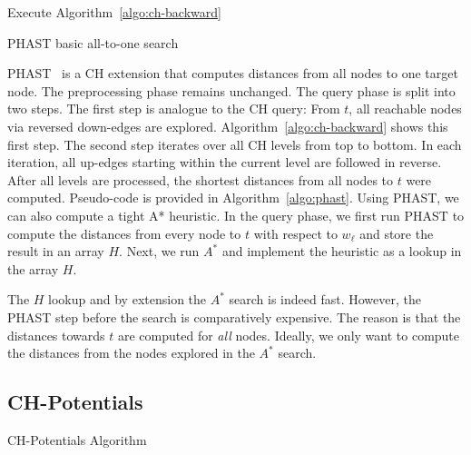 \documentclass[a4paper,USenglish,cleveref, autoref, thm-restate]{lipics-v2019}
\begin{document}
\begin{algorithm2e}
Execute Algorithm~\ref{algo:ch-backward}\;
\caption{PHAST basic all-to-one search}
\label{algo:phast}
\end{algorithm2e}

PHAST~\cite{dgnw-phast-13} is a CH extension that computes distances from all nodes to one target node.
The preprocessing phase remains unchanged.
The query phase is split into two steps.
The first step is analogue to the CH query:
From $t$, all reachable nodes via reversed down-edges are explored.
Algorithm~\ref{algo:ch-backward} shows this first step.
The second step iterates over all CH levels from top to bottom.
In each iteration, all up-edges starting within the current level are followed in reverse.
After all levels are processed, the shortest distances from all nodes to $t$ were computed.
Pseudo-code is provided in Algorithm~\ref{algo:phast}.
Using PHAST, we can also compute a tight A* heuristic.
In the query phase, we first run PHAST to compute the distances from every node to $t$ with respect to $w_\ell$ and store the result in an array $H$.
Next, we run $A^*$ and implement the heuristic as a lookup in the array $H$.

The $H$ lookup and by extension the $A^*$ search is indeed fast.
However, the PHAST step before the search is comparatively expensive.
The reason is that the distances towards $t$ are computed for \emph{all} nodes.
Ideally, we only want to compute the distances from the nodes explored in the $A^*$ search.

\subsection{CH-Potentials}

\begin{algorithm2e}
\caption{CH-Potentials Algorithm}
\label{algo:pot}
\end{algorithm2e}
\end{document}
